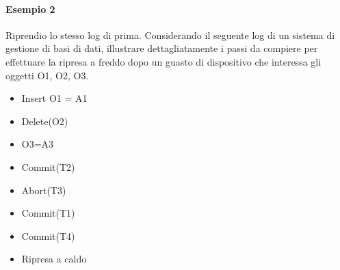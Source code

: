 \paragraph{Esempio 2} Riprendio lo stesso log di prima. Considerando il seguente log di un sistema di gestione di basi di dati, illustrare dettagliatamente i passi da compiere per effettuare la ripresa a freddo dopo un guasto di dispositivo che interessa gli oggetti O1, O2, O3.

\begin{itemize}
	\item Insert O1 = A1
	\item Delete(O2)
	\item O3=A3
	\item Commit(T2)
	\item Abort(T3)
	\item Commit(T1)
	\item Commit(T4)
	\item Ripresa a caldo
\end{itemize}